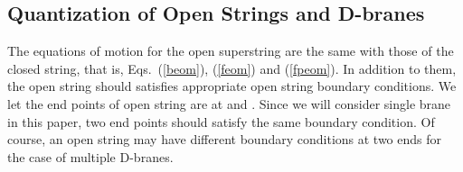 \documentclass[a4paper,12pt]{article}
\begin{document}
\subsection{Quantization of Open Strings and D-branes}

The equations of motion for the open superstring are the same with
those of the closed string, that is, Eqs.~(\ref{beom}), (\ref{feom})
and (\ref{fpeom}).  In addition to them, the open string should
satisfies appropriate open string boundary conditions.  We let the end
points of open string are at \coordHE{} and \myHighlight{$\sigma = \pi$}\coordHE{}.  Since
we will consider single brane in this paper, two end points should
satisfy the same boundary condition.  Of course, an open string may
have different boundary conditions at two ends for the case of
multiple D-branes.
\end{document}
